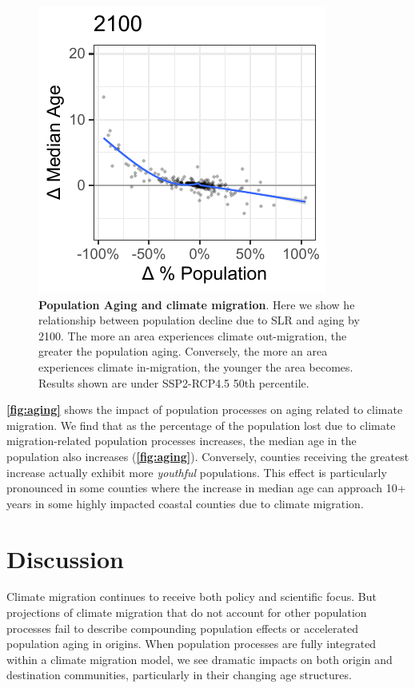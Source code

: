 \documentclass[12pt]{article}
\begin{document}
\begin{figure}
\includegraphics[width=0.7\linewidth]{FigAging3} \caption{\textbf{Population Aging and climate migration}. Here we show he relationship between population decline due to SLR and aging by 2100. The more an area experiences climate out-migration, the greater the population aging. Conversely, the more an area experiences climate in-migration, the younger the area becomes. Results shown are under SSP2-RCP4.5 50th percentile. \label{fig:aging}}\label{fig:figaging}
\end{figure}

\textbf{\autoref{fig:aging}} shows the impact of population processes on
aging related to climate migration. We find that as the percentage of
the population lost due to climate migration-related population
processes increases, the median age in the population also increases
(\textbf{\autoref{fig:aging}}). Conversely, counties receiving the
greatest increase actually exhibit more \emph{youthful} populations.
This effect is particularly pronounced in some counties where the
increase in median age can approach 10+ years in some highly impacted
coastal counties due to climate migration.

\hypertarget{discussion}{%
\section{Discussion}\label{discussion}}

Climate migration continues to receive both policy and scientific focus.
But projections of climate migration that do not account for other
population processes fail to describe compounding population effects or
accelerated population aging in origins. When population processes are
fully integrated within a climate migration model, we see dramatic
impacts on both origin and destination communities, particularly in
their changing age structures.
\end{document}
